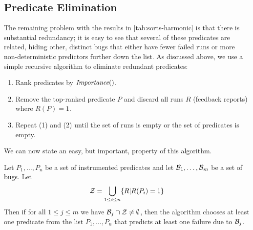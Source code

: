 \subsection{Predicate Elimination}
\label{sec:elimination}

The remaining problem with the results in \autoref{tab:sorts-harmonic}
is that there is substantial redundancy; it is easy to see that several of these
predicates are related, hiding other, distinct bugs that either have
fewer failed runs or more non-deterministic predictors further down the
list.  As discussed above, we use a simple recursive algorithm to eliminate
redundant predicates:
\begin{enumerate}

\item Rank predicates by $\textit{Importance}()$.

\item Remove the top-ranked predicate $P$ and discard all runs $R$ (feedback reports) where  $R(P) = 1$.

\item Repeat (1) and (2) until the set of runs is empty or the set of predicates is empty.
\end{enumerate}


We can now state an easy, but important, property of this algorithm.  
\begin{lemma}
\rm
Let $P_1,\ldots,P_n$ be a set of instrumented predicates and let ${\cal B}_1,\ldots,{\cal B}_m$ be a set of bugs.  Let
\[ {\cal Z} = \bigcup_{1 \leq i \leq n} \{ R | R(P_i) = 1 \} \]
Then if for all $1 \leq j \leq m$ we have ${\cal B}_j \cap {\cal Z} \neq \emptyset$, then 
the algorithm chooses at least one predicate from the list $P_1,\ldots,P_n$ that predicts
at least one failure due to ${\cal B}_j$.
\end{lemma}

